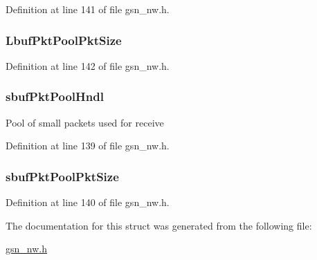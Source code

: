 Definition at line 141 of file gsn\_\-nw.h.

\hypertarget{a00164_a3acb08aea3a6eb76474385d92513ffb6}{
\subsubsection[{LbufPktPoolPktSize}]{ {\bf LbufPktPoolPktSize}}}
\label{a00164_a3acb08aea3a6eb76474385d92513ffb6}


Definition at line 142 of file gsn\_\-nw.h.

\hypertarget{a00164_a8505ded3aa3e411e22a897e74c1603a6}{
\subsubsection[{sbufPktPoolHndl}]{ {\bf sbufPktPoolHndl}}}
\label{a00164_a8505ded3aa3e411e22a897e74c1603a6}
Pool of small packets used for receive 

Definition at line 139 of file gsn\_\-nw.h.

\hypertarget{a00164_a42386fb051a55ad1c912c6cab2f5aae4}{
\subsubsection[{sbufPktPoolPktSize}]{ {\bf sbufPktPoolPktSize}}}
\label{a00164_a42386fb051a55ad1c912c6cab2f5aae4}


Definition at line 140 of file gsn\_\-nw.h.



The documentation for this struct was generated from the following file:\begin{DoxyCompactItemize}
\item 
\hyperlink{a00532}{gsn\_\-nw.h}\end{DoxyCompactItemize}
